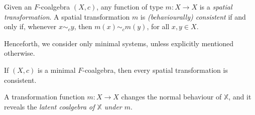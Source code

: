 \begin{definition}
Given an $F$-coalgebra $(X,c)$, any function of type $m\colon X\rightarrow X$ is a \emph{spatial transformation}. %
A spatial transformation $m$ is \emph{(behaviourally) consistent} if and only if, whenever $x\sim_c y$, then $m(x)\sim_{c} m(y)$, for all $x,y \in X$. %
\end{definition}
Henceforth, we consider only minimal systems, unless explicitly mentioned otherwise. 
\begin{corollary}
    If $(X,c)$ is a minimal $F$-coalgebra, then every spatial transformation %
    is consistent. 
\end{corollary}
A transformation function $m\colon X\rightarrow X$ changes the normal behaviour of $\mathbb{X}$, and it reveals the \emph{latent coalgebra of $\mathbb{X}$ under $m$}. 

